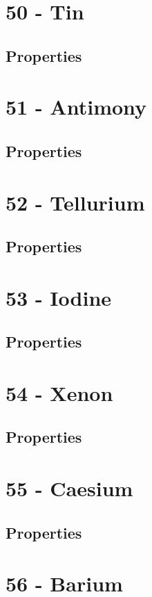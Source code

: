 \documentclass{book}
\begin{document}
\section{50 - Tin}
\label{sec:elem-tin}
\subsection{Properties}

\section{51 - Antimony}
\label{sec:elem-antimony}
\subsection{Properties}

\section{52 - Tellurium}
\label{sec:elem-tellurium}
\subsection{Properties}

\section{53 - Iodine}
\label{sec:elem-iodine}
\subsection{Properties}

\section{54 - Xenon}
\label{sec:elem-xenon}
\subsection{Properties}

\section{55 - Caesium}
\label{sec:elem-caesium}
\subsection{Properties}

\section{56 - Barium}
\label{sec:elem-barium}
\end{document}
